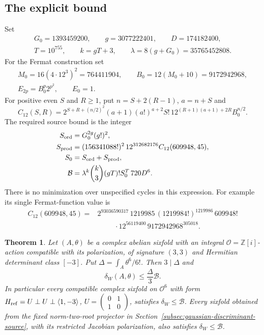 \documentclass[11pt]{article}
\newtheorem{theorem}{Theorem}[section]
\theoremstyle{definition}
\theoremstyle{remark}
\begin{document}
\subsection{The explicit bound}
Set
\[
 \begin{gathered}
 G_0=1393459200,\qquad g=3077222401,\qquad D=174182400,\\
 T=10^{755},\qquad k=gT+3,\qquad \lambda=8(g+G_0)=35765452808.
 \end{gathered}
\]
For the Fermat construction set
\[
 \begin{gathered}
 M_0=16(4\cdot12^3)^2=764411904,\qquad B_0=12(M_0+10)=9172942968,\\
 E_{2p}=B_0^p2^{p^2},\qquad E_0=1.
 \end{gathered}
\]
For positive even $S$ and $R\ge1$, put $n=S+2(R-1)$, $a=n+S$ and
\begin{equation}\label{eq:gaussian-discriminant-fermat}
 C_{12}(S,R)=
 2^{S+R+(n/2)^2}(a+1)(a!)^{a+2}S!\,
 12^{(R+1)(a+1)+2R}B_0^{n/2}.
\end{equation}
The required source bound is the integer
\begin{equation}\label{eq:gaussian-discriminant-bound}
 \begin{split}
 S_{\rm ord}&=G_0^{2g}(g!)^2,\\
 S_{\rm prod}&=(156341088!)^2\,12^{312682176}C_{12}(609948,45),\\
 S_0&=S_{\rm ord}+S_{\rm prod},\\
 \mathcal B&=\lambda^k\binom{k}{3}(gT)!S_0^T\,720D^6.
 \end{split}
\end{equation}
There is no minimization over unspecified cycles in this expression.
For example its single Fermat-function value is
\[
 \begin{split}
 C_{12}(609948,45)={}&
 2^{93036590317}\,1219985\,(1219984!)^{1219986}\,609948!\\
 &\hspace{1cm}\cdot12^{56119400}\,9172942968^{305018}.
 \end{split}
\]

\begin{theorem}\label{thm:gaussian-volume-bound}
Let $(A,\theta)$ be a complex abelian sixfold with an integral
$\mathcal O=\mathbb Z[i]$-action compatible with its polarization,
of signature $(3,3)$ and Hermitian determinant class $[-3]$.
Put $\Delta=\int_A\theta^6/6!$.  Then $3\mid\Delta$ and
\begin{equation}\label{eq:gaussian-discriminant-target}
              \delta_W(A,\theta)\le\frac{\Delta}{3}\mathcal B.
\end{equation}
In particular every compatible complex sixfold on
$\mathcal O^6$ with form
$H_{\rm ref}=U\perp U\perp\langle1,-3\rangle$,
$U=\left(\begin{smallmatrix}0&1\\1&0\end{smallmatrix}\right)$,
satisfies $\delta_W\le\mathcal B$.
Every sixfold obtained from the fixed norm-two-root projector in
Section~\ref{subsec:gaussian-discriminant-source}, with its restricted
Jacobian polarization, also satisfies $\delta_W\le\mathcal B$.
\end{theorem}
\end{document}
